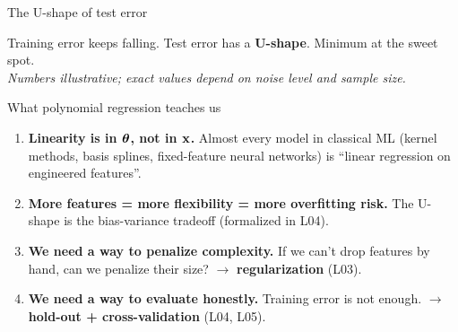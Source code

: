 \documentclass[aspectratio=169]{beamer}
\begin{document}
\begin{frame}{The U-shape of test error}
  \begin{center}
  \end{center}
  Training error keeps falling. Test error has a \textbf{U-shape}. Minimum at the sweet spot.\\
  \textit{Numbers illustrative; exact values depend on noise level and sample size.}
\end{frame}

\begin{frame}{What polynomial regression teaches us}
  \begin{enumerate}
    \item \textbf{Linearity is in $\bm{\theta}$, not in $\mathbf{x}$.} Almost every model in classical ML (kernel methods, basis splines, fixed-feature neural networks) is ``linear regression on engineered features''.
    \item \textbf{More features = more flexibility = more overfitting risk.} The U-shape is the bias-variance tradeoff (formalized in L04).
    \item \textbf{We need a way to penalize complexity.} If we can't drop features by hand, can we penalize their size? $\to$ \textbf{regularization} (L03).
    \item \textbf{We need a way to evaluate honestly.} Training error is not enough. $\to$ \textbf{hold-out + cross-validation} (L04, L05).
  \end{enumerate}
\end{frame}
\end{document}

